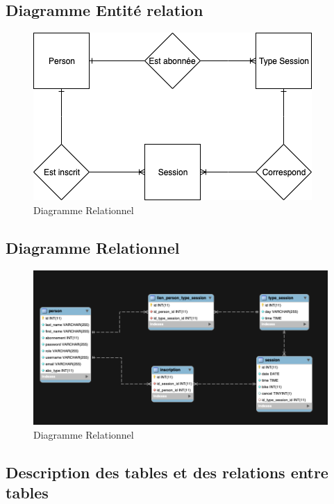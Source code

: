 \subsection{Diagramme Entité relation}
	\begin{figure}[h!]
       	\includegraphics[width=0.8\linewidth, center]{Figures/Entite-relation.png}
       	\caption{Diagramme Relationnel}
	\end{figure}

\subsection{Diagramme Relationnel}
	\begin{figure}[h!]
       	\includegraphics[width=\linewidth, center]{Figures/Diagramme-Relationnel}
       	 \caption{Diagramme Relationnel}
	\end{figure}
	
	
\subsection{Description des tables et des relations entre tables}
	\paragraph{}
		